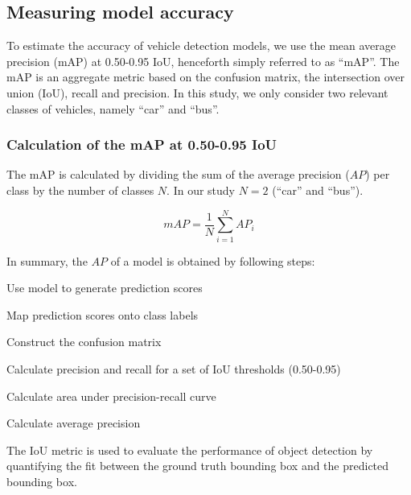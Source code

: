 \documentclass[]{article}
\begin{document}
\subsection{Measuring model accuracy}

	To estimate the accuracy of vehicle detection models, we use the mean average precision (mAP) at 0.50-0.95 IoU, henceforth simply referred to as ``mAP''. The mAP is an aggregate metric based on the confusion matrix, the intersection over union (IoU), recall and precision. In this study, we only consider two relevant classes of vehicles, namely ``car'' and ``bus''.

\subsubsection{Calculation of the mAP at 0.50-0.95 IoU}

	The mAP is calculated by dividing the sum of the average precision ($AP$) per class by the number of classes $N$.  In our study $N = 2$ (``car'' and ``bus'').
	
	\[
	mAP = \frac{1}{N} \sum_{i=1}^{N} AP_i
	\]
	
	In summary, the $AP$ of a model is obtained by following steps:
	
	\begin{center}
		\begin{compactenum}
			\item Use model to generate prediction scores
			\item Map prediction scores onto class labels
			\item Construct the confusion matrix
			\item Calculate precision and recall for a set of IoU thresholds (0.50-0.95)
			\item Calculate area under precision-recall curve
			\item Calculate average precision
		\end{compactenum}
	\end{center}
	
	The IoU metric is used to evaluate the performance of object detection by quantifying the fit between the ground truth bounding box and the predicted bounding box.
	
\end{document}
